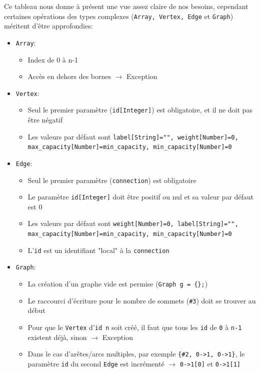 \documentclass[french]{article}
\begin{document}
				Ce tableau nous donne à présent une vue assez claire de nos besoins, cependant certaines opérations des types complexes (\texttt{Array, Vertex, Edge} et \texttt{Graph}) méritent d'être approfondies:
				
				\begin{itemize}
					\item \texttt{Array}: 
					\begin{itemize}
						\item Index de 0 à n-1
						\item Accès en dehors des bornes $\rightarrow$ Exception
					\end{itemize}
					\item \texttt{Vertex}:
					\begin{itemize}
						\item Seul le premier paramètre (\texttt{id[Integer]}) est obligatoire, et il ne doit pas être négatif
						\item Les valeurs par défaut sont \texttt{label[String]="", weight[Number]=0, max\_capacity[Number]=min\_capacity, min\_capacity[Number]=0}
					\end{itemize}
					\item \texttt{Edge}: 
					\begin{itemize}
						\item Seul le premier paramètre (\texttt{connection}) est obligatoire
						\item Le paramètre \texttt{id[Integer]} doit être positif ou nul et sa valeur par défaut est 0
						\item Les valeurs par défaut sont \texttt{weight[Number]=0, label[String]="", max\_capacity[Number]=min\_capacity, min\_capacity[Number]=0}
						\item L'\texttt{id} est un identifiant "local" à la \texttt{connection}
					\end{itemize}
					\item \texttt{Graph}: 
					\begin{itemize}
						\item La création d'un graphe vide est permise (\texttt{Graph g = \{\};})
						\item Le raccourci d'écriture pour le nombre de sommets (\texttt{\#3}) doit se trouver au début
						\item Pour que le \texttt{Vertex} d'\texttt{id n} soit créé, il faut que tous les \texttt{id} de \texttt{0} à \texttt{n-1} existent déjà, sinon $\rightarrow$ Exception 
						\item Dans le cas d'arêtes/arcs multiples, par exemple \texttt{\{\#2, 0->1, 0->1\}}, le paramètre \texttt{id} du second \texttt{Edge} est incrémenté $\rightarrow$ \texttt{0->1[0]} et \texttt{0->1[1]}

\end{itemize}
\end{itemize}
\end{document}
